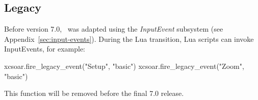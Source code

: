 \subsection{Legacy}\label{sec:lua.legacy}

Before version 7.0, \xc\ was adapted using the \emph{InputEvent}
subsystem (see Appendix~\ref{sec:input-events}).  During the Lua
transition, Lua scripts can invoke InputEvents, for example:

\begin{lua}
xcsoar.fire_legacy_event("Setup", "basic")
xcsoar.fire_legacy_event("Zoom", "basic")
\end{lua}

This function will be removed before the final 7.0 release.
